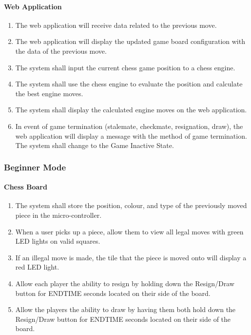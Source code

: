 \documentclass[12pt]{article}
\begin{document}
\paragraph{Web Application}
\begin{enumerate}[{EA}1., leftmargin=2\parindent]
    \item The web application will receive data related to the previous move.
    \item The web application will display the updated game board configuration with the data of the previous move.
    \item The system shall input the current chess game position to a chess engine.
    \item The system shall use the chess engine to evaluate the position and calculate the best engine moves.
    \item The system shall display the calculated engine moves on the web application.
    \item In event of game termination (stalemate, checkmate, resignation, draw), the web application will display a message with the method of game termination. The system shall change to the Game Inactive State.
\end{enumerate}

\subsubsection{Beginner Mode}
\paragraph{Chess Board}
\begin{enumerate}[{BB}1., leftmargin=2\parindent]
    \item The system shall store the position, colour, and type of the previously moved piece in the micro-controller.
    \item When a user picks up a piece, allow them to view all legal moves with green LED lights on valid squares.
    \item If an illegal move is made, the tile that the piece is moved onto will display a red LED light.
    \item Allow each player the ability to resign by holding down the Resign/Draw button for ENDTIME seconds located on their side of the board.
    \item Allow the players the ability to draw by having them both hold down the Resign/Draw button for ENDTIME seconds located on their side of the board.
\end{enumerate}
\end{document}
